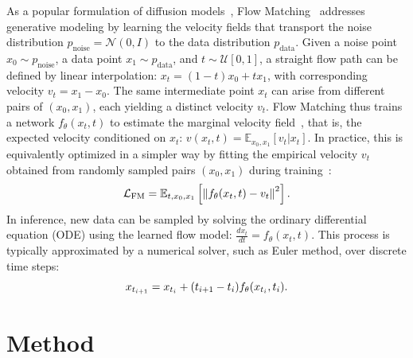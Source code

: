 \documentclass{article} %
\begin{document}
As a popular formulation of diffusion models~\citep{difussion_2015,ddpm,ddim,rezende2015variational,kingma2023understanding}, Flow Matching~\citep{fm1,fm2} addresses generative modeling by learning the velocity fields that transport the noise distribution $p_{\mathrm{noise}}=\mathcal{N}(0, I)$ to the data distribution $p_{\mathrm{data}}$. Given a noise point $x_0 \sim  p_{\mathrm{noise}}$, a data point $x_1 \sim p_{\mathrm{data}}$, and $t \sim \mathcal{U}[0, 1]$, a straight flow path can be defined by linear interpolation: $x_t = (1-t) x_0 + t x_1$, with corresponding velocity $v_t = x_1 - x_0$.
The same intermediate point $x_t$ can arise from different pairs of $(x_0, x_1)$, each yielding a distinct velocity $v_t$. 
Flow Matching thus trains a network $f_{\theta}(x_t, t)$ to estimate the marginal velocity field~\citep{fm1}, that is, the expected velocity conditioned on $x_t$: $v(x_t, t) = \mathbb{E}_{x_0, x_1} [v_t | x_t]$. 
In practice, this is equivalently optimized in a simpler way by fitting the empirical velocity $v_t$ obtained from randomly sampled pairs $(x_0, x_1)$ during training~\citep{fm1}:
\begin{equation}
\label{eq:fm_loss}
\vspace{-0.5em}
\mathcal{L}_{\mathrm{FM}} = \mathbb{E}_{t,x_0,x_1} \left[\left\| f_{\theta}(x_t, t) - v_t \right\|^2\right].
\vspace{-0.3em}
\end{equation}
In inference, new data can be sampled by solving the ordinary differential equation (ODE) using the learned flow model: $\frac{d x_t}{d t}=f_{\theta}(x_t, t)$.
This process is typically approximated by a numerical solver, such as Euler method, over discrete time steps:  
\begin{equation}
\vspace{-0.7em}
\label{eq:fm_ode}
x_{t_{i+1}} = x_{t_i} + (t_{i+1} - t_i)f_{\theta}(x_{t_i}, t_i).
\vspace{-0.8em}
\end{equation}



\vspace{-0.8em}
\section{Method}
\vspace{-0.8em}

\end{document}
